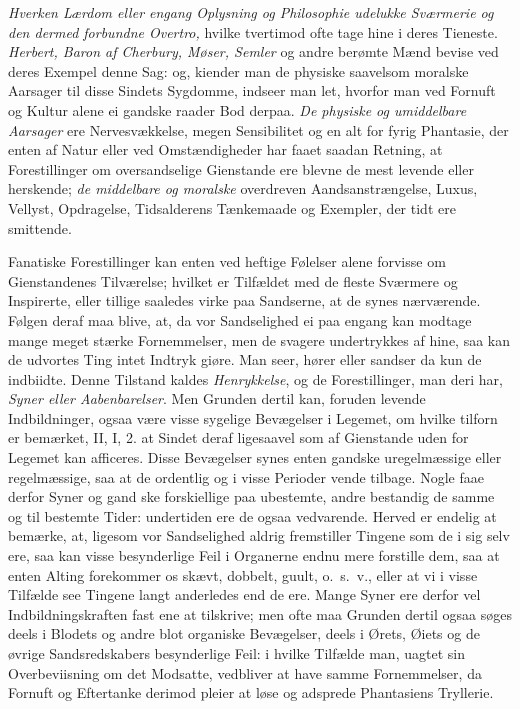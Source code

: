 \documentclass[12pt,a4paper]{article}
\newcommand{\opage}[1]{\marginnote{\footnotesize\textit{[#1]}}}
\begin{document}
\emph{Hverken Lærdom eller engang Oplysning og Philosophie udelukke Sværmerie og den
dermed forbundne Overtro,} hvilke tvertimod ofte tage hine i deres Tieneste.
\emph{Herbert, Baron af Cherbury, Møser, Semler} og andre berømte Mænd bevise ved deres
Exempel denne Sag: og, kiender man de physiske saavelsom moralske Aarsager til disse
Sindets Sygdomme, indseer man let, hvorfor man ved Fornuft og Kultur alene ei gandske
raader Bod
\opage{143} derpaa. \emph{De physiske og umiddelbare Aarsager} ere Nervesvækkelse, megen Sensibilitet
og en alt for fyrig Phantasie, der enten af Natur eller ved Omstændigheder har faaet
saadan Retning, at Forestillinger om oversandselige Gienstande ere blevne de mest levende
eller herskende; \emph{de middelbare og moralske} overdreven Aandsanstrængelse, Luxus,
Vellyst, Opdragelse, Tidsalderens Tænkemaade og Exempler, der tidt ere smittende.

Fanatiske Forestillinger kan enten ved heftige Følelser alene forvisse om Gienstandenes
Tilværelse; hvilket er Tilfældet med de fleste Sværmere og Inspirerte, eller tillige
saaledes virke paa Sandserne, at de synes nærværende. Følgen deraf maa blive, at, da vor
Sandselighed ei paa engang kan modtage mange meget stærke Fornemmelser, men de svagere
undertrykkes af hine, saa kan de udvortes Ting intet Indtryk giøre. Man seer, hører eller
sandser da kun de indbiidte. Denne Tilstand kaldes \emph{Henrykkelse}, og de
Forestillinger, man deri har, \emph{Syner eller Aabenbarelser}. Men Grunden dertil kan,
foruden levende Indbildninger, ogsaa være visse sygelige Bevægelser i Legemet, om hvilke
tilforn er bemærket, II, I, 2. at Sindet deraf ligesaavel som af Gienstande uden for
Legemet kan afficeres. Disse Bevægelser synes enten gandske uregelmæssige eller
regelmæssige, saa at de ordentlig og i visse Perioder vende tilbage. Nogle faae derfor
Syner og gand%
\opage{144}ske forskiellige paa ubestemte, andre bestandig de samme og til bestemte Tider:
undertiden ere de ogsaa vedvarende. Herved er endelig at bemærke, at, ligesom vor
Sandselighed aldrig fremstiller Tingene som de i sig selv ere, saa kan visse besynderlige
Feil i Organerne endnu mere forstille dem, saa at enten Alting forekommer os skævt,
dobbelt, guult, o.~s.~v., eller at vi i visse Tilfælde see Tingene langt anderledes end de
ere. Mange Syner ere derfor vel Indbildningskraften fast ene at tilskrive; men ofte maa
Grunden dertil ogsaa søges deels i Blodets og andre blot organiske Bevægelser, deels i
Ørets, Øiets og de øvrige Sandsredskabers besynderlige Feil: i hvilke Tilfælde man,
uagtet sin Overbeviisning om det Modsatte, vedbliver at have samme Fornemmelser, da
Fornuft og Eftertanke derimod pleier at løse og adsprede Phantasiens Tryllerie.
\end{document}
